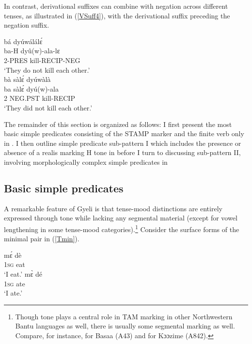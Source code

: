 \noindent In contrast,  derivational suffixes can combine with negation across different tenses, as illustrated in (\ref{VSuff4}), with the derivational suffix preceding the negation suffix.

\begin{exe}
\ex\label{VSuff4}
\begin{xlist}
\ex \label{VSuff4a}
  \glll  bá dyúwálálɛ́  \\
          ba-H dyû(w)-ala-lɛ \\
            2-PRES kill-RECIP-NEG \\
    \trans `They do not kill each other.' \\
\ex\label{VSuff4b}
  \glll  bà sàlɛ́ dyúwàlà \\
          ba sàlɛ́ dyú(w)-ala  \\
            2 NEG.PST kill-RECIP \\
    \trans `They did not kill each other.' \\
\end{xlist}
\end{exe}

The remainder of this section is organized as follows: I first present the most basic simple predicates consisting of the STAMP marker and the finite verb only in . I then outline simple predicate sub-pattern I which includes the presence or absence of a realis marking H tone in  before I turn to discussing sub-pattern II, involving morphologically complex simple predicates in 






\subsection{Basic simple predicates}
\label{sec:GramTM}

A remarkable feature of Gyeli is that tense-mood distinctions are entirely expressed through tone while lacking any segmental material (except for vowel lengthening in some tense-mood categories).\footnote{Though tone plays a central role in TAM marking in other Northwestern Bantu languages as well, there is usually some segmental marking as well. Compare, for instance, \citet{makasso2012} for Basaa (A43) and \citet{beavon91} for Kɔɔzime (A842).}
Consider the surface forms of the minimal pair in (\ref{Tmin}).

\begin{exe}
\ex\label{Tmin}
\begin{xlist}
\ex \label{Tmin1}
  \gll  mɛ́ dè \\
            1\textsc{sg} eat \\
    \trans `I eat.'
\ex\label{Tmin2}
 \gll  mɛ̀ dé \\
         1\textsc{sg} ate \\
    \trans `I ate.'
\end{xlist}
\end{exe}

